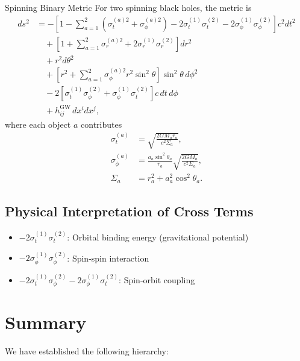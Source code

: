 \documentclass[11pt,a4paper]{article}
\theoremstyle{definition}
\theoremstyle{remark}
\begin{document}
	Spinning Binary Metric
		For two spinning black holes, the metric is
		\begin{equation}
			\boxed{
				\begin{aligned}
					ds^2 &= -\left[1 - \sum_{a=1}^2 \left(\sigma_t^{(a)2} + \sigma_\phi^{(a)2}\right) - 2\sigma_t^{(1)}\sigma_t^{(2)} - 2\sigma_\phi^{(1)}\sigma_\phi^{(2)}\right] c^2 dt^2\\
					&\quad + \left[1 + \sum_{a=1}^2 \sigma_r^{(a)2} + 2\sigma_r^{(1)}\sigma_r^{(2)}\right] dr^2\\
					&\quad + r^2 d\theta^2\\
					&\quad + \left[r^2 + \sum_{a=1}^2 \sigma_\phi^{(a)2} r^2\sin^2\theta\right] \sin^2\theta \, d\phi^2\\
					&\quad - 2\left[\sigma_t^{(1)}\sigma_\phi^{(2)} + \sigma_\phi^{(1)}\sigma_t^{(2)}\right] c \, dt \, d\phi\\
					&\quad + h_{ij}^{\text{GW}} \, dx^i dx^j,
				\end{aligned}
			}
		\end{equation}
		where each object $a$ contributes
		\begin{align}
			\sigma_t^{(a)} &= \sqrt{\frac{2GM_a r_a}{c^2\Sigma_a}},\\
			\sigma_\phi^{(a)} &= \frac{a_a \sin^2\theta_a}{r_a} \sqrt{\frac{2GM_a}{c^2\Sigma_a}},\\
			\Sigma_a &= r_a^2 + a_a^2 \cos^2\theta_a.
		\end{align}
	
	\subsection{Physical Interpretation of Cross Terms}
	
	\begin{itemize}
		\item $-2\sigma_t^{(1)}\sigma_t^{(2)}$: Orbital binding energy (gravitational potential)
		\item $-2\sigma_\phi^{(1)}\sigma_\phi^{(2)}$: Spin-spin interaction
		\item $-2\sigma_t^{(1)}\sigma_\phi^{(2)} - 2\sigma_\phi^{(1)}\sigma_t^{(2)}$: Spin-orbit coupling
	\end{itemize}
	
	\section{Summary}
	
	We have established the following hierarchy:
	
\end{document}

